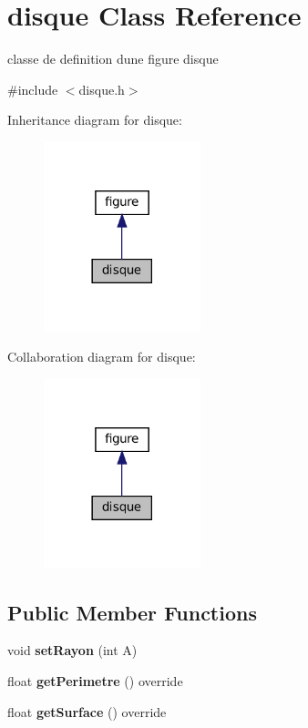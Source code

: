 \hypertarget{classdisque}{}\section{disque Class Reference}
\label{classdisque}


classe de definition d\textquotesingle{}une figure disque  




{\ttfamily \#include $<$disque.\+h$>$}



Inheritance diagram for disque\+:
\nopagebreak
\begin{figure}[H]
\begin{center}
\leavevmode
\includegraphics[width=129pt]{classdisque__inherit__graph}
\end{center}
\end{figure}


Collaboration diagram for disque\+:
\nopagebreak
\begin{figure}[H]
\begin{center}
\leavevmode
\includegraphics[width=129pt]{classdisque__coll__graph}
\end{center}
\end{figure}
\subsection*{Public Member Functions}
\begin{DoxyCompactItemize}
\item 
\mbox{\label{classdisque_a0b2efca226d978af39559a696bb84488}} 
void {\bfseries set\+Rayon} (int A)
\item 
\mbox{\label{classdisque_a6503c0a336e4391d4a0254b5d720d029}} 
float {\bfseries get\+Perimetre} () override
\item 
\mbox{\label{classdisque_aafffe3cc0969974593133322b8d12719}} 
float {\bfseries get\+Surface} () override
\end{DoxyCompactItemize}
